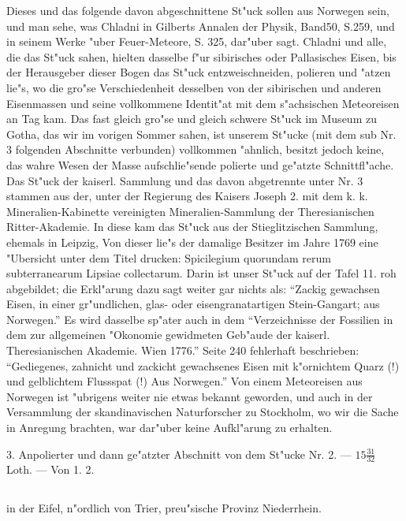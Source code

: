 \documentclass[a4paper, 11pt, oneside, polutonikogreek, german]{article}
\begin{document}
{\footnotesize Dieses und das folgende davon abgeschnittene St"uck sollen aus Norwegen sein, und man sehe, was Chladni in Gilberts Annalen der Physik, Band50, S.259, und in seinem Werke "uber Feuer-Meteore, S. 325, dar"uber sagt. Chladni und alle, die das St"uck sahen, hielten dasselbe f"ur sibirisches oder Pallasisches Eisen, bis der Herausgeber dieser Bogen das St"uck entzweischneiden, polieren und "atzen lie"s, wo die gro"se Verschiedenheit desselben von der sibirischen und anderen Eisenmassen und seine vollkommene Identit"at mit dem s"achsischen Meteoreisen an Tag kam. Das fast gleich gro"se und gleich schwere St"uck im Museum zu Gotha, das wir im vorigen Sommer sahen, ist unserem St"ucke (mit dem sub Nr. 3 folgenden Abschnitte verbunden) vollkommen "ahnlich, besitzt jedoch keine, das wahre Wesen der Masse aufschlie"sende polierte und ge"atzte Schnittfl"ache. Das St"uck der kaiserl. Sammlung und das davon abgetrennte unter Nr. 3 stammen aus der, unter der Regierung des Kaisers Joseph 2. mit dem k. k. Mineralien-Kabinette vereinigten Mineralien-Sammlung der Theresianischen Ritter-Akademie. In diese kam das St"uck aus der Stieglitzischen Sammlung, ehemals in Leipzig, Von dieser lie"s der damalige Besitzer im Jahre 1769 eine "Ubersicht unter dem Titel drucken: Spicilegium quorundam rerum subterranearum Lipsiae collectarum. Darin ist unser St"uck auf der Tafel 11. roh abgebildet; die Erkl"arung dazu sagt weiter gar nichts als: "`Zackig gewachsen Eisen, in einer gr"undlichen, glas- oder eisengranatartigen Stein-Gangart; aus Norwegen."' Es wird dasselbe sp"ater auch in dem "`Verzeichnisse der Fossilien in dem zur allgemeinen "Okonomie gewidmeten Geb"aude der kaiserl. Theresianischen Akademie. Wien 1776."' Seite 240 fehlerhaft beschrieben: "`Gediegenes, zahnicht und zackicht gewachsenes Eisen mit k"ornichtem Quarz (!) und gelblichtem Flussspat (!) Aus Norwegen."' Von einem Meteoreisen aus Norwegen ist "ubrigens weiter nie etwas bekannt geworden, und auch in der Versammlung der skandinavischen Naturforscher zu Stockholm, wo wir die Sache in Anregung brachten, war dar"uber keine Aufkl"arung zu erhalten.}

\setlength{\leftskip}{0pt}
\setlength{\parindent}{20pt}

3. Anpolierter und dann ge"atzter Abschnitt von dem St"ucke Nr. 2. --- $15\frac{31}{32}$ Loth. --- Von 1. 2.
\subsection[\frakfamily{Bitburg.}]{}
\begin{center}

in der Eifel, n"ordlich von Trier, preu"sische Provinz Niederrhein.
\end{center}
\end{document}
